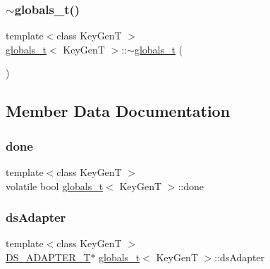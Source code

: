 \mbox{\label{structglobals__t_a8525f6c198268c6bc418ef030be994dd}} 
\subsubsection{\texorpdfstring{$\sim$globals\+\_\+t()}{~globals\_t()}}
{\footnotesize\ttfamily template$<$class Key\+GenT $>$ \\
\hyperlink{structglobals__t}{globals\+\_\+t}$<$ Key\+GenT $>$\+::$\sim$\hyperlink{structglobals__t}{globals\+\_\+t} (\begin{DoxyParamCaption}{ }\end{DoxyParamCaption})\hspace{0.3cm}{\ttfamily [inline]}}



\subsection{Member Data Documentation}
\mbox{\label{structglobals__t_acff1b66760476ec1d523e374c616824d}} 
\subsubsection{\texorpdfstring{done}{done}}
{\footnotesize\ttfamily template$<$class Key\+GenT $>$ \\
volatile bool \hyperlink{structglobals__t}{globals\+\_\+t}$<$ Key\+GenT $>$\+::done}

\mbox{\label{structglobals__t_a481d3a5120349414f793ac72e391a36e}} 
\subsubsection{\texorpdfstring{ds\+Adapter}{dsAdapter}}
{\footnotesize\ttfamily template$<$class Key\+GenT $>$ \\
\hyperlink{microbench_2main_8cpp_ad1d56d4b6df42b94c7525e7c4559d700}{D\+S\+\_\+\+A\+D\+A\+P\+T\+E\+R\+\_\+T}$\ast$ \hyperlink{structglobals__t}{globals\+\_\+t}$<$ Key\+GenT $>$\+::ds\+Adapter}

